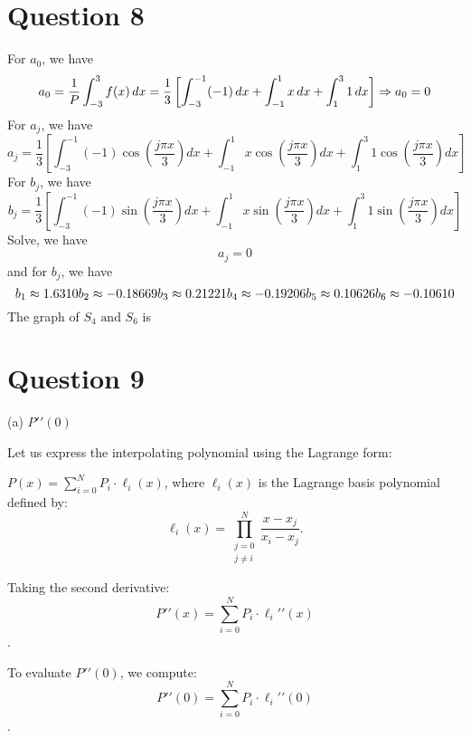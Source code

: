 \documentclass{article}
\newcommand{\infixand}{\text{ and }}
\begin{document}
{{\section*{Question 8}

For $a_0$, we have
\[ a_0 = \frac{1}{P}  \int_{- 3}^3 f (x)  \hspace{0.17em} dx = \frac{1}{3} 
   \left[ \int_{- 3}^{- 1} (- 1) \hspace{0.17em} dx + \int_{- 1}^1 x
   \hspace{0.17em} dx + \int_1^3 1 \hspace{0.17em} dx \right] \Rightarrow a_0
   = 0 \]
For $a_j$, we have
\[ a_j = \frac{1}{3}  \left[ \int_{- 3}^{- 1} (- 1) \cos \left( \frac{j \pi
   x}{3} \right) dx + \int_{- 1}^1 x \cos \left( \frac{j \pi x}{3} \right) dx
   + \int_1^3 1 \cos \left( \frac{j \pi x}{3} \right) dx \right] \]
For $b_j$, we have
\[ b_j = \frac{1}{3}  \left[ \int_{- 3}^{- 1} (- 1) \sin \left( \frac{j \pi
   x}{3} \right) dx + \int_{- 1}^1 x \sin \left( \frac{j \pi x}{3} \right) dx
   + \int_1^3 1 \sin \left( \frac{j \pi x}{3} \right) dx \right] \]
Solve, we have
\[ {a_j}  = 0 \]
and for $b_j$, we have
\[ \\
   b_1 \approx 1.6310
   
   b_2 \approx - 0.18669
   
   b_3 \approx 0.21221
   
   b_4 \approx - 0.19206
   
   b_5 \approx 0.10626
   
   b_6 \approx - 0.10610 \]
The graph of $S_4 \infixand S_6$ is


\section*{Question 9}
(a) $P{\prime}{\prime}(0)$

Let us express the interpolating polynomial using the Lagrange form:

$P(x) = \sum_{i=0}^{N} P_i \cdot \ell_i(x)$,
where $\ell_i(x)$ is the Lagrange basis polynomial defined by:
\[
\ell_i(x) = \prod_{\substack{j = 0 \\ j \ne i}}^{N} \frac{x - x_j}{x_i - x_j}.
\]

Taking the second derivative:
$$
P{\prime}{\prime}(x) = \sum_{i=0}^{N} P_i \cdot \ell_i{\prime}{\prime}(x)
$$.

To evaluate $P{\prime}{\prime}(0)$, we compute:
$$P{\prime}{\prime}(0) = \sum_{i=0}^{N} P_i \cdot \ell_i{\prime}{\prime}(0)$$.

}}
\end{document}
